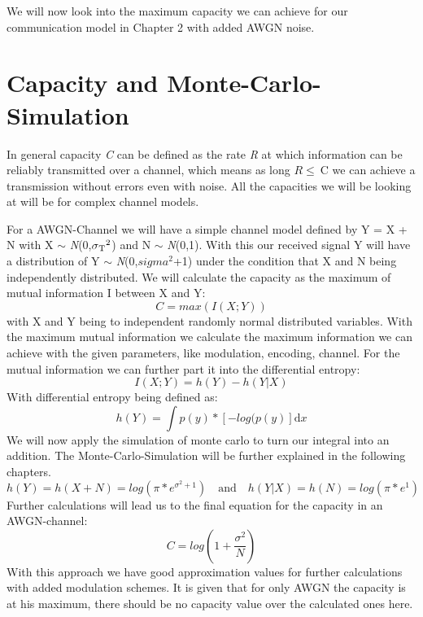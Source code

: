 \documentclass[12pt,oneside, reqno]{report}
\begin{document}
We will now look into the maximum capacity we can achieve for our communication model in Chapter 2 with added AWGN noise.

\section{Capacity and Monte-Carlo-Simulation}

In general capacity \textit{C} can be defined as the rate \textit{R} at which information can be reliably transmitted over a channel, which means as long $R \leq \ $C we can achieve a transmission without errors even with noise. All the capacities we will be looking at will be for complex channel models.

For a \gls{AWGN}-Channel we will have a simple channel model defined by Y = X + N with X $\sim$ \textit{N}(0,$\sigma\textsubscript{T}^2$) and N $\sim$ \textit{N}(0,1). With this our received signal Y will have a distribution of Y $\sim$ \textit{N}(0,$sigma^2$+1) under the condition that X and N being independently distributed.
We will calculate the capacity as the maximum of mutual information I between X and Y:
\begin{equation}
\label{eq:cap}
C = max(I(X;Y))     
\end{equation}
with X and Y being to independent randomly normal distributed variables.
With the maximum mutual information we calculate the maximum information we can achieve with the given parameters, like modulation, encoding, channel. 
\newline
For the mutual information we can further part it into the differential entropy:
\begin{equation}
I(X;Y) = h(Y) - h(Y|X)
\end{equation}
\newline
With differential entropy being defined as:
\begin{equation}
h(Y) = \int p(y)*[-log(p(y)] \mathrm{d}x
\end{equation}
We will now apply the simulation of monte carlo to turn our integral into an addition. The Monte-Carlo-Simulation will be further explained in the following chapters.
\begin{equation}
h(Y) = h(X+N) = log(\pi*e^{\sigma^2+1}) \quad \textrm{and} \quad h(Y|X) = h(N) = log(\pi*e^{1})
\end{equation}
Further calculations will lead us to the final equation for the capacity in an AWGN-channel:
\begin{equation}
C = log(1+\frac{\sigma^2}{N})
\end{equation}
With this approach we have good approximation values for further calculations with added modulation schemes. It is given that for only AWGN the capacity is at his maximum, there should be no capacity value over the calculated ones here. 
\end{document}
